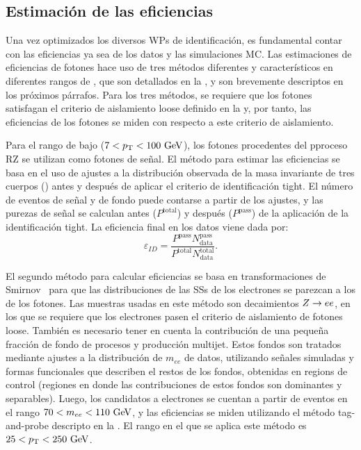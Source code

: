 \subsection{Estimaci\'on de las eficiencias}

Una vez optimizados los diversos \acp{WP} de identificaci\'on, es fundamental contar con las eficiencias ya sea de los datos y las simulaciones \ac{MC}. Las estimaciones de eficiencias de fotones hace uso de tres m\'etodos diferentes y caracter\'isticos en diferentes rangos de \pt, que son detallados en la , y son brevemente descriptos en los pr\'oximos p\'arrafos.
Para los tres m\'etodos, se requiere que los fotones satisfagan el criterio de aislamiento loose definido en la \Sect{\ref{subsec:objects:egamma:iso}} y, por tanto, las eficiencias de los fotones se miden con respecto a este criterio de aislamiento. 

Para el rango de bajo \pt (\(7<p_{\text{T}}<100~\text{GeV}\)), los fotones procedentes del pproceso \ac{RZ} se utilizan como fotones de señal. El m\'etodo para estimar las eficiencias se basa en el uso de ajustes a la distribución observada de la masa invariante de tres cuerpos (\mlly) antes y después de aplicar el criterio de identificaci\'on tight. El número de eventos de señal y de fondo puede contarse a partir de los ajustes, y las purezas de señal se calculan antes (\(P^{\text{total}}\)) y despu\'es (\(P^{\text{pass}}\)) de la aplicaci\'on de la identificaci\'on tight.
La eficiencia final en los datos viene dada por:
\begin{equation*}
    \varepsilon_{ID} = \frac{ P^{\text{pass}} N_{\text{data}}^{\text{pass}} }{ P^{\text{total}} N_{\text{data}}^{\text{total}} }.
\end{equation*}

El segundo método para calcular eficiencias se basa en transformaciones de Smirnov~\cite{SmirnovTransform} para que las distribuciones de las \acp{SS} de los electrones se parezcan a los de los fotones. Las muestras usadas en este m\'etodo son decaimientos \(Z\rightarrow ee\), en los que se requiere que los electrones pasen el criterio de aislamiento de fotones loose. Tambi\'en es necesario tener en cuenta la contribuci\'on de una peque\~na fracci\'on de fondo de procesos \Wjets y producción multijet. Estos fondos son tratados mediante ajustes a la distribuci\'on de \(m_{ee}\) de datos, utilizando señales simuladas y formas funcionales que describen el restos de los fondos, obtenidas en regions de control (regiones en donde las contribuciones de estos fondos son dominantes y separables). Luego, los candidatos a electrones se cuentan a partir de eventos en el rango \(70 < m_{ee} < 110~\text{GeV}\), y las eficiencias se miden utilizando el método tag-and-probe descripto en la . El rango \pt en el que se aplica este método es \(25<p_{\text{T}}<250~\text{GeV}\).

